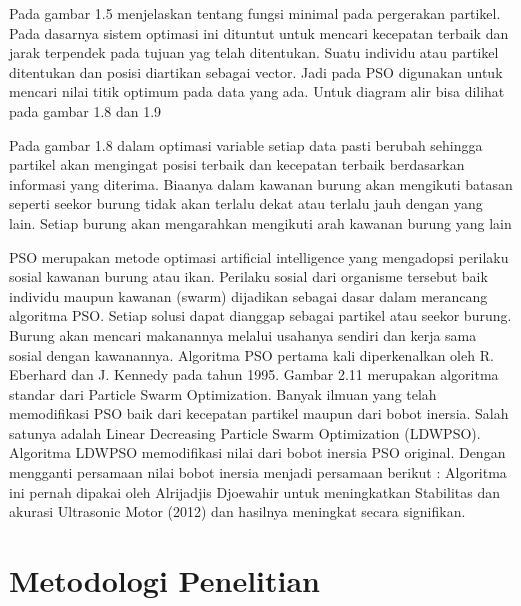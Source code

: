\documentclass[11pt]{article}
\numberwithin{equation}{subsection}
\begin{document}
Pada gambar 1.5 menjelaskan tentang fungsi minimal pada pergerakan partikel.
Pada dasarnya sistem optimasi ini dituntut untuk mencari kecepatan terbaik dan jarak terpendek pada tujuan yag telah ditentukan.
Suatu individu atau partikel ditentukan  dan posisi diartikan  sebagai vector.
Jadi pada PSO digunakan untuk mencari nilai titik optimum pada data yang ada.
Untuk diagram alir bisa dilihat pada gambar 1.8 dan 1.9

Pada gambar 1.8  dalam optimasi variable setiap data pasti berubah sehingga partikel akan mengingat posisi terbaik dan kecepatan terbaik berdasarkan informasi yang diterima.
Biaanya dalam kawanan burung akan mengikuti batasan seperti seekor burung tidak akan terlalu dekat atau terlalu jauh dengan yang lain.
Setiap burung akan mengarahkan mengikuti arah kawanan burung yang lain

PSO merupakan metode optimasi artificial intelligence yang  mengadopsi perilaku sosial kawanan burung atau ikan.
Perilaku sosial dari organisme tersebut baik individu maupun kawanan (swarm) dijadikan sebagai dasar dalam merancang algoritma PSO.
Setiap solusi dapat dianggap sebagai partikel atau seekor burung.
Burung akan mencari makanannya melalui usahanya sendiri dan kerja sama sosial dengan kawanannya.
Algoritma PSO  pertama  kali diperkenalkan  oleh  R.  Eberhard  dan  J.  Kennedy  pada  tahun 1995.
Gambar 2.11 merupakan algoritma standar dari Particle Swarm Optimization.
Banyak ilmuan yang telah memodifikasi PSO baik dari kecepatan partikel maupun dari bobot inersia.
Salah satunya adalah Linear Decreasing Particle Swarm Optimization (LDWPSO).
Algoritma LDWPSO memodifikasi nilai dari bobot inersia PSO original.
Dengan mengganti persamaan nilai bobot inersia menjadi persamaan berikut :
Algoritma ini pernah dipakai oleh Alrijadjis Djoewahir untuk meningkatkan Stabilitas dan akurasi Ultrasonic Motor (2012) dan hasilnya meningkat secara signifikan.



\newpage

\setcounter{figure}{0}

\section{Metodologi Penelitian}
\end{document}
